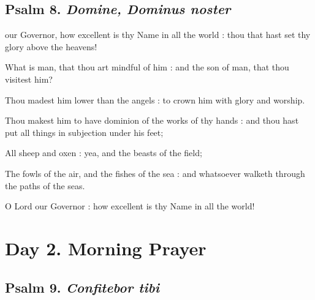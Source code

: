 \subsection{Psalm 8. \textit{Domine, Dominus noster}}

 our Governor, how excellent is thy Name in all the world : thou that hast set thy glory above the heavens!\par
{}
What is man, that thou art mindful of him : and the son of man, that thou visitest him?\par
{}Thou madest him lower than the angels : to crown him with glory and worship.\par
{}Thou makest him to have dominion of the works of thy hands : and thou hast put all things in subjection under his feet;\par
{}All sheep and oxen : yea, and the beasts of the field;\par
{}The fowls of the air, and the fishes of the sea : and whatsoever walketh through the paths of the seas.\par
{}O Lord our Governor : how excellent is thy Name in all the world!\par

\section*{Day 2. Morning Prayer}

\subsection{Psalm 9. \textit{Confitebor tibi}}

